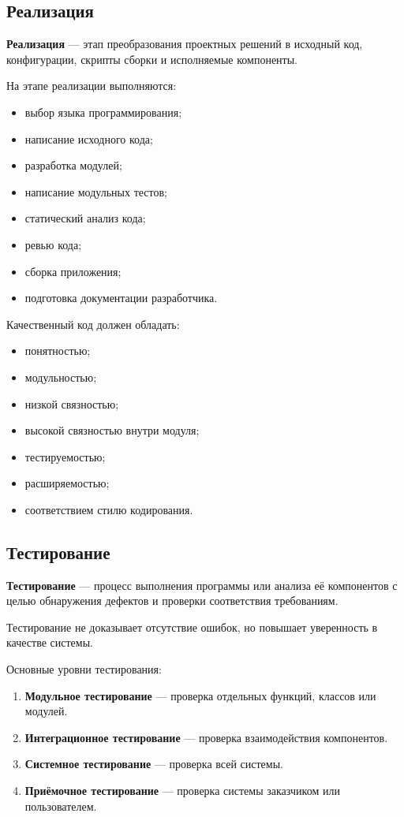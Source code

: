 \documentclass[12pt,a4paper]{article}
\begin{document}
\subsection{Реализация}

\textbf{Реализация} --- этап преобразования проектных решений в исходный код, конфигурации, скрипты сборки и исполняемые компоненты.

На этапе реализации выполняются:
\begin{itemize}
    \item выбор языка программирования;
    \item написание исходного кода;
    \item разработка модулей;
    \item написание модульных тестов;
    \item статический анализ кода;
    \item ревью кода;
    \item сборка приложения;
    \item подготовка документации разработчика.
\end{itemize}

Качественный код должен обладать:
\begin{itemize}
    \item понятностью;
    \item модульностью;
    \item низкой связностью;
    \item высокой связностью внутри модуля;
    \item тестируемостью;
    \item расширяемостью;
    \item соответствием стилю кодирования.
\end{itemize}

\subsection{Тестирование}

\textbf{Тестирование} --- процесс выполнения программы или анализа её компонентов с целью обнаружения дефектов и проверки соответствия требованиям.

Тестирование не доказывает отсутствие ошибок, но повышает уверенность в качестве системы.

Основные уровни тестирования:
\begin{enumerate}
    \item \textbf{Модульное тестирование} --- проверка отдельных функций, классов или модулей.
    \item \textbf{Интеграционное тестирование} --- проверка взаимодействия компонентов.
    \item \textbf{Системное тестирование} --- проверка всей системы.
    \item \textbf{Приёмочное тестирование} --- проверка системы заказчиком или пользователем.
\end{enumerate}
\end{document}
